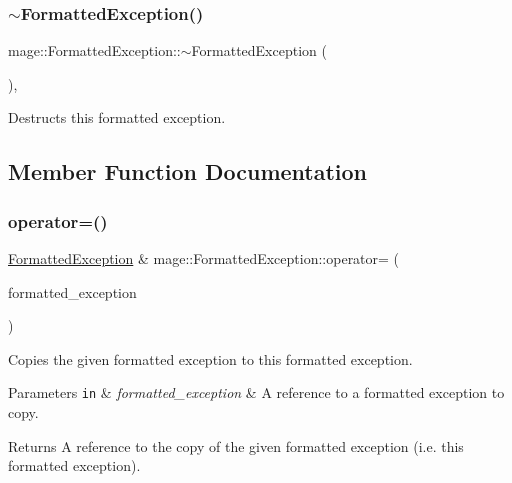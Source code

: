 \subsubsection{\texorpdfstring{$\sim$\+Formatted\+Exception()}{~FormattedException()}}
{\footnotesize\ttfamily mage\+::\+Formatted\+Exception\+::$\sim$\+Formatted\+Exception (\begin{DoxyParamCaption}{ }\end{DoxyParamCaption})\hspace{0.3cm}{\ttfamily [virtual]}, {\ttfamily [default]}}

Destructs this formatted exception. 

\subsection{Member Function Documentation}
\hypertarget{structmage_1_1_formatted_exception_acc0ecbe1d510c5103ff4fd5b7054213b}{}\label{structmage_1_1_formatted_exception_acc0ecbe1d510c5103ff4fd5b7054213b} 
\subsubsection{\texorpdfstring{operator=()}{operator=()}\hspace{0.1cm}{\footnotesize\ttfamily [1/2]}}
{\footnotesize\ttfamily \hyperlink{structmage_1_1_formatted_exception}{Formatted\+Exception} \& mage\+::\+Formatted\+Exception\+::operator= (\begin{DoxyParamCaption}\item[{const \hyperlink{structmage_1_1_formatted_exception}{Formatted\+Exception} \&}]{formatted\+\_\+exception }\end{DoxyParamCaption})\hspace{0.3cm}{\ttfamily [default]}}

Copies the given formatted exception to this formatted exception.


\begin{DoxyParams}[1]{Parameters}
\mbox{\tt in}  & {\em formatted\+\_\+exception} & A reference to a formatted exception to copy. \\
\hline
\end{DoxyParams}
\begin{DoxyReturn}{Returns}
A reference to the copy of the given formatted exception (i.\+e. this formatted exception). 
\end{DoxyReturn}
\hypertarget{structmage_1_1_formatted_exception_aed7565e923543206710aa5f71ba5893a}{}\label{structmage_1_1_formatted_exception_aed7565e923543206710aa5f71ba5893a} 
